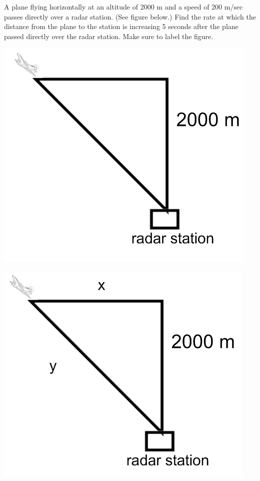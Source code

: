 \documentclass[nooutcomes]{ximera}
\begin{document}
\begin{problem}
A plane flying horizontally at an altitude of 2000 m and a speed of 200 m/sec passes directly over a radar station.  (See figure below.)  Find the rate at which the distance from the plane to the station is increasing 5 seconds after the plane passed directly over the radar station.  Make sure to label the figure.

	\begin{image}
	\includegraphics[scale=.5]{Figure4.png}
	\end{image}
\begin{freeResponse} \hfil

	\begin{image}
	\includegraphics[scale=.5]{Figure5.png}
	\end{image}


\end{freeResponse}
\end{problem}
\end{document}
